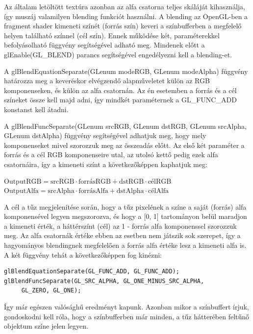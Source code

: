 Az általam letöltött textúra azonban az alfa csatorna teljes skáláját kihasználja, így muszáj valamilyen blending funkciót használni. A blending az OpenGL-ben a fragment shader kimeneti színét (forrás szín) keveri a színbufferben a megfelelő helyen található színnel (cél szín). Ennek működése két, paraméterekkel befolyásolható függvény segítségével adható meg. Mindenek előtt a glEnable(GL\_BLEND) parancs segítségével engedélyezni kell a blending-et.

A glBlendEquationSeparate(GLenum modeRGB, GLenum modeAlpha) függvény határozza meg a keveréskor elvégzendő alapműveletet külön az RGB komponenseken, és külön az alfa csatornán. Az én esetemben a forrás és a cél színeket össze kell majd adni, így mindkét paraméternek a GL\_FUNC\_ADD konstanst kell átadni.

A glBlendFuncSeparate(GLenum srcRGB, GLenum dstRGB, GLenum srcAlpha, GLenum dstAlpha) függvény segítségével adhatjuk meg, hogy mely komponenseket mivel szorozzuk meg az összeadás előtt. Az első két paraméter a forrás és a cél RGB komponenseire utal, az utolsó kettő pedig ezek alfa csatornáira, így a kimeneti színt a következőképpen kaphatjuk meg: 
\begin{center}
$\text{OutputRGB} = \text{srcRGB} \cdot \text{forrásRGB} + \text{dstRGB} \cdot \text{célRGB}$
$\text{OutputAlfa} = \text{srcAlpha} \cdot \text{forrásAlfa} + \text{dstAlpha} \cdot \text{célAlfa}$
\end{center}
A cél a tűz megjelenítése során, hogy a tűz pixelének a színe a saját (forrás) alfa komponensével legyen megszorozva, és hogy a [0, 1] tartományon belül maradjon a kimeneti érték, a háttérszínt (cél) az 1 - forrás alfa komponenssel szorozzuk meg. Az alfa csatornák értéke ebben az esetben nem játszik sok szerepet, így a hagyományos blendingnek megfelelően a forrás alfa értéke lesz a kimeneti alfa is. A két függvény tehát a következőképpen fog kinézni:
\begin{lstlisting}
glBlendEquationSeparate(GL_FUNC_ADD, GL_FUNC_ADD);
glBlendFuncSeparate(GL_SRC_ALPHA, GL_ONE_MINUS_SRC_ALPHA,
	 GL_ZERO, GL_ONE);
\end{lstlisting}

Így már egészen valósághű eredményt kapunk. Azonban mikor a színbuffert írjuk, gondoskodni kell róla, hogy a színbufferben már minden, a tűz hátterében feltűnő objektum színe jelen legyen.

